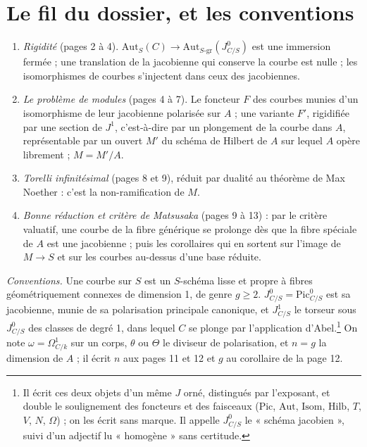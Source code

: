 \documentclass[11pt,a4paper]{article}
\begin{document}
\section*{Le fil du dossier, et les conventions}

\begin{enumerate}
\item[1.] \emph{Rigidité} (pages 2 à 4). $\mathrm{Aut}_{S}(C) \to
\mathrm{Aut}_{S\text{-gr}}(J^{0}_{C/S})$ est une immersion fermée ; une
translation de la jacobienne qui conserve la courbe est nulle ; les
isomorphismes de courbes s'injectent dans ceux des jacobiennes.
\item[2.] \emph{Le problème de modules} (pages 4 à 7). Le foncteur $F$ des
courbes munies d'un isomorphisme de leur jacobienne polarisée sur $A$ ; une
variante $F'$, rigidifiée par une section de $J^{1}$, c'est-à-dire par un
plongement de la courbe dans $A$, représentable par un ouvert $M'$ du schéma
de Hilbert de $A$ sur lequel $A$ opère librement ; $M = M'/A$.
\item[3.] \emph{Torelli infinitésimal} (pages 8 et 9), réduit par dualité au
théorème de Max Noether : c'est la non-ramification de $M$.
\item[4.] \emph{Bonne réduction et critère de Matsusaka} (pages 9 à 13) : par le
critère valuatif, une courbe de la fibre générique se prolonge dès que la
fibre spéciale de $A$ est une jacobienne ; puis les corollaires qui en sortent
sur l'image de $M \to S$ et sur les courbes au-dessus d'une base réduite.
\end{enumerate}

\emph{Conventions.} Une courbe sur $S$ est un $S$-schéma lisse et propre à
fibres géométriquement connexes de dimension 1, de genre $g \geq 2$.
$J^{0}_{C/S} = \mathrm{Pic}^{0}_{C/S}$ est sa jacobienne, munie de sa
polarisation principale canonique, et $J^{1}_{C/S}$ le torseur sous
$J^{0}_{C/S}$ des classes de degré 1, dans lequel $C$ se plonge par
l'application d'Abel.\footnote{Il écrit ces deux objets d'un même $J$ orné,
distingués par l'exposant, et double le soulignement des foncteurs et des
faisceaux ($\mathrm{Pic}$, $\mathrm{Aut}$, $\mathrm{Isom}$, $\mathrm{Hilb}$,
$T$, $V$, $N$, $\Omega$) ; on les écrit sans marque. Il appelle
$J^{0}_{C/S}$ le « schéma jacobien », suivi d'un adjectif lu « homogène » sans
certitude.} On note $\omega = \Omega^{1}_{C/k}$ sur un corps, $\theta$ ou
$\Theta$ le diviseur de polarisation, et $n = g$ la dimension de $A$ ; il écrit
$n$ aux pages 11 et 12 et $g$ au corollaire de la page 12.
\end{document}
